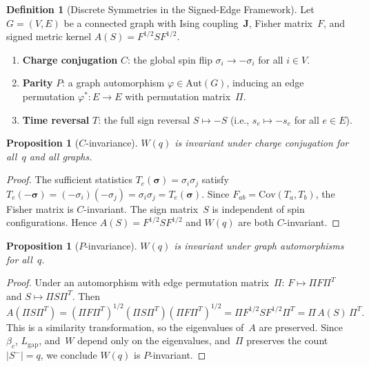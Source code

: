 \documentclass[11pt]{article}
\newtheorem{proposition}[theorem]{Proposition}
\theoremstyle{definition}
\newtheorem{definition}[theorem]{Definition}
\theoremstyle{remark}
\begin{document}
\begin{definition}[Discrete Symmetries in the Signed-Edge Framework]
\label{def:cpt}
Let $G = (V, E)$ be a connected graph with Ising coupling~$\mathbf{J}$,
Fisher matrix~$F$, and signed metric kernel $A(S) = F^{1/2} S F^{1/2}$.
\begin{enumerate}
  \item \textbf{Charge conjugation} $C$: the global spin flip
    $\sigma_i \to -\sigma_i$ for all $i \in V$.
  \item \textbf{Parity} $P$: a graph automorphism $\varphi \in \mathrm{Aut}(G)$,
    inducing an edge permutation $\varphi^* \colon E \to E$ with permutation
    matrix~$\Pi$.
  \item \textbf{Time reversal} $T$: the full sign reversal
    $S \mapsto -S$ (i.e., $s_e \mapsto -s_e$ for all $e \in E$).
\end{enumerate}
\end{definition}

\begin{proposition}[$C$-invariance]
\label{prop:C-inv}
$W(q)$ is invariant under charge conjugation for all~$q$ and all graphs.
\end{proposition}

\begin{proof}
The sufficient statistics $T_e(\boldsymbol{\sigma}) = \sigma_i \sigma_j$
satisfy $T_e(-\boldsymbol{\sigma}) = (-\sigma_i)(-\sigma_j) = \sigma_i \sigma_j
= T_e(\boldsymbol{\sigma})$. Since $F_{ab} = \mathrm{Cov}(T_a, T_b)$, the
Fisher matrix is $C$-invariant. The sign matrix~$S$ is independent of
spin configurations. Hence $A(S) = F^{1/2} S F^{1/2}$ and $W(q)$ are both
$C$-invariant.
\end{proof}

\begin{proposition}[$P$-invariance]
\label{prop:P-inv}
$W(q)$ is invariant under graph automorphisms for all~$q$.
\end{proposition}

\begin{proof}
Under an automorphism with edge permutation matrix~$\Pi$:
$F \mapsto \Pi F \Pi^T$ and $S \mapsto \Pi S \Pi^T$. Then
\[
  A(\Pi S \Pi^T) = (\Pi F \Pi^T)^{1/2} (\Pi S \Pi^T) (\Pi F \Pi^T)^{1/2}
  = \Pi F^{1/2} S F^{1/2} \Pi^T = \Pi \, A(S) \, \Pi^T.
\]
This is a similarity transformation, so the eigenvalues of~$A$ are preserved.
Since $\beta_c$, $L_{\mathrm{gap}}$, and~$W$ depend only on the eigenvalues,
and~$\Pi$ preserves the count $|S^-| = q$, we conclude
$W(q)$ is $P$-invariant.
\end{proof}
\end{document}
